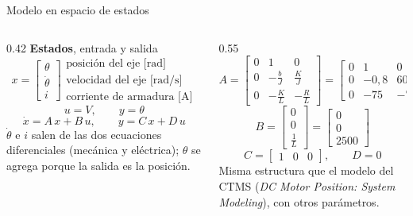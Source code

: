 \documentclass[11pt,aspectratio=169]{beamer}
\begin{document}
\begin{frame}{Modelo en espacio de estados}
  \begin{columns}[T]
    \begin{column}{0.42\textwidth}
      \textbf{Estados}, entrada y salida
      \[
        x=\begin{bmatrix}\theta\\ \dot\theta\\ i\end{bmatrix}
        \begin{array}{l}
          \text{posición del eje [rad]}\\
          \text{velocidad del eje [rad/s]}\\
          \text{corriente de armadura [A]}
        \end{array}
      \]
      \[
        u = V,\qquad y = \theta
      \]
      \[
        \dot x = A\,x + B\,u,\qquad y = C\,x + D\,u
      \]
      \small
      $\dot\theta$ e $i$ salen de las dos ecuaciones diferenciales (mecánica y eléctrica);
      $\theta$ se agrega porque la salida es la posición.
    \end{column}
    \begin{column}{0.55\textwidth}
      \[
        A=\begin{bmatrix}0&1&0\\0&-\frac{b}{J}&\frac{K}{J}\\[2pt]0&-\frac{K}{L}&-\frac{R}{L}\end{bmatrix}
         =\begin{bmatrix}0&1&0\\0&-0{,}8&6000\\0&-75&-7500\end{bmatrix}
      \]
      \[
        B=\begin{bmatrix}0\\0\\\frac{1}{L}\end{bmatrix}=\begin{bmatrix}0\\0\\2500\end{bmatrix}
      \]
      \[
        C=\begin{bmatrix}1&0&0\end{bmatrix},\qquad D=0
      \]
      \small
      Misma estructura que el modelo del CTMS (\emph{DC Motor Position: System Modeling}),
      con otros parámetros.
    \end{column}
  \end{columns}
\end{frame}
\end{document}
